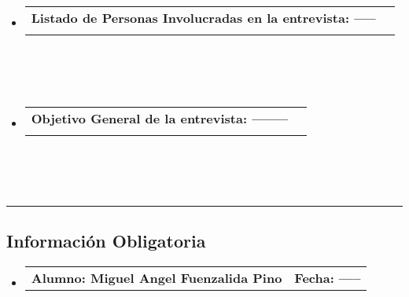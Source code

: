 \documentclass[10pt,letterpaper]{article}
\makeatletter
\newcommand{\headerrow}[2]
{\begin{tabular*}{\linewidth}{l@{\extracolsep{\fill}}r}
	#1 &
	#2 \\
\end{tabular*}}
\makeatother
\begin{document}
\begin{itemize}
	\parskip=0.1em

	\item
	\headerrow
		{\textbf{Listado de Personas Involucradas en la entrevista: -----}}
	\\
	\\
	\\
	\\
	\item
	\headerrow
		{\textbf{Objetivo General de la entrevista: -------- }}
	\\
	\\
	\\
	\\

\end{itemize}


\hrule
\vspace{-0.4em}
\subsection*{Información Obligatoria}

\begin{itemize}
	\parskip=0.1em

	\item 
	\headerrow
		{\textbf{Alumno: Miguel Angel Fuenzalida Pino}}
		{\textbf{Fecha: -----}}

\end{itemize}
\end{document}
